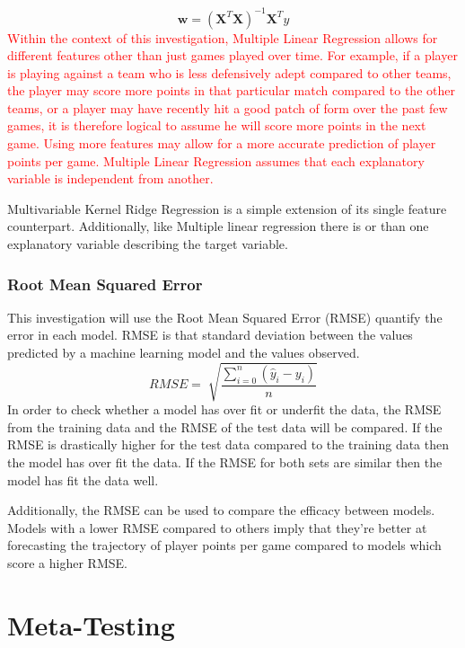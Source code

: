 \documentclass[a4paper,11pt,twoside]{article}
\begin{document}
\begin{equation}
\textbf{w} = (\textbf{X}^T\textbf{X})^{-1}\textbf{X}^Ty
\end{equation}
\textcolor{red}{Within the context of this investigation, Multiple Linear Regression allows for different features other than just games played over time. For example, if a player is playing against a team who is less defensively adept compared to other teams, the player may score more points in that particular match compared to the other teams, or a player may have recently hit a good patch of form over the past few games, it is therefore logical to assume he will score more points in the next game. Using more features may allow for a more accurate prediction of player points per game. Multiple Linear Regression assumes that each explanatory variable is independent from another.}

Multivariable Kernel Ridge Regression is a simple extension of its single feature counterpart. Additionally, like Multiple linear regression there is or than one explanatory variable describing the target variable. 


\subsubsection{Root Mean Squared Error}
This investigation will use the Root Mean Squared Error (RMSE) quantify the error in each model. RMSE is that standard deviation between the values predicted by a machine learning model and the values observed.
\begin{equation}
RMSE = \sqrt[]{\frac{\sum_{i=0}^{n}(\hat{y}_{i} - y_{i})}{n}}
\end{equation}
In order to check whether a model has over fit or underfit the data, the RMSE from the training data and the RMSE of the test data will be compared. If the RMSE is drastically higher for the test data compared to the training data then the model has over fit the data. If the RMSE for both sets are similar then the model has fit the data well. 

Additionally, the RMSE can be used to compare the efficacy between models. Models with a lower RMSE compared to others imply that they're better at forecasting the trajectory of player points per game compared to models which score a higher RMSE.


\newpage
\section{Meta-Testing}
\end{document}
